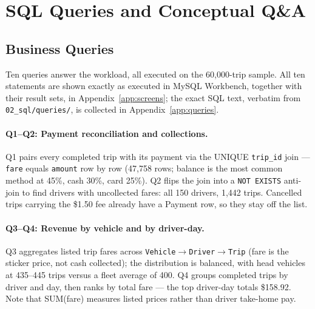 \section{SQL Queries and Conceptual Q\&A}
\label{sec:sql}

\subsection{Business Queries}

Ten queries answer the workload, all executed on the 60{,}000-trip sample. All ten statements are shown exactly as executed in MySQL Workbench, together with their result sets, in Appendix~\ref{app:screens}; the exact SQL text, verbatim from \texttt{02\_sql/queries/}, is collected in Appendix~\ref{app:queries}.

\paragraph{Q1--Q2: Payment reconciliation and collections.}
Q1 pairs every completed trip with its payment via the UNIQUE \texttt{trip\_id} join --- \texttt{fare} equals \texttt{amount} row by row (47{,}758 rows; balance is the most common method at 45\%, cash 30\%, card 25\%). Q2 flips the join into a \texttt{NOT EXISTS} anti-join to find drivers with uncollected fares: all 150 drivers, 1{,}442 trips. Cancelled trips carrying the \$1.50 fee already have a Payment row, so they stay off the list.

\paragraph{Q3--Q4: Revenue by vehicle and by driver-day.}
Q3 aggregates listed trip fares across \texttt{Vehicle}$\to$\allowbreak\texttt{Driver}$\to$\allowbreak\texttt{Trip} (fare is the sticker price, not cash collected); the distribution is balanced, with head vehicles at 435--445 trips versus a fleet average of 400. Q4 groups completed trips by driver and day, then ranks by total fare --- the top driver-day totals \$158.92. Note that SUM(fare) measures listed prices rather than driver take-home pay.

